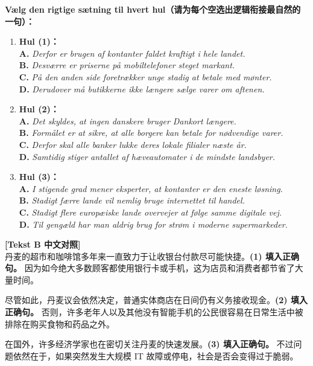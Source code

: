 \vspace{0.25em}
\textbf{Vælg den rigtige sætning til hvert hul（请为每个空选出逻辑衔接最自然的一句）：}
\begin{enumerate}
  \item \textbf{Hul (1)：}\\
    \textbf{A.} \textit{Derfor er brugen af kontanter faldet kraftigt i hele landet.}\\
    \textbf{B.} \textit{Desværre er priserne på mobiltelefoner steget markant.}\\
    \textbf{C.} \textit{På den anden side foretrækker unge stadig at betale med mønter.}\\
    \textbf{D.} \textit{Derudover må butikkerne ikke længere sælge varer om aftenen.}
  \item \textbf{Hul (2)：}\\
    \textbf{A.} \textit{Det skyldes, at ingen danskere bruger Dankort længere.}\\
    \textbf{B.} \textit{Formålet er at sikre, at alle borgere kan betale for nødvendige varer.}\\
    \textbf{C.} \textit{Derfor skal alle banker lukke deres lokale filialer næste år.}\\
    \textbf{D.} \textit{Samtidig stiger antallet af hæveautomater i de mindste landsbyer.}
  \item \textbf{Hul (3)：}\\
    \textbf{A.} \textit{I stigende grad mener eksperter, at kontanter er den eneste løsning.}\\
    \textbf{B.} \textit{Stadigt færre lande vil nemlig bruge internettet til handel.}\\
    \textbf{C.} \textit{Stadigt flere europæiske lande overvejer at følge samme digitale vej.}\\
    \textbf{D.} \textit{Til gengæld har man aldrig brug for strøm i moderne supermarkeder.}
\end{enumerate}

\begin{transbox}
\small
\textbf{\color{NCDTeal}[Tekst B 中文对照]}\\
丹麦的超市和咖啡馆多年来一直致力于让收银台付款尽可能快捷。\textbf{(1) 填入正确句。} 因为如今绝大多数顾客都使用银行卡或手机，这为店员和消费者都节省了大量时间。

尽管如此，丹麦议会依然决定，普通实体商店在日间仍有义务接收现金。\textbf{(2) 填入正确句。} 否则，许多老年人以及其他没有智能手机的公民很容易在日常生活中被排除在购买食物和药品之外。

在国外，许多经济学家也在密切关注丹麦的快速发展。\textbf{(3) 填入正确句。} 不过问题依然在于，如果突然发生大规模 IT 故障或停电，社会是否会变得过于脆弱。
\end{transbox}

